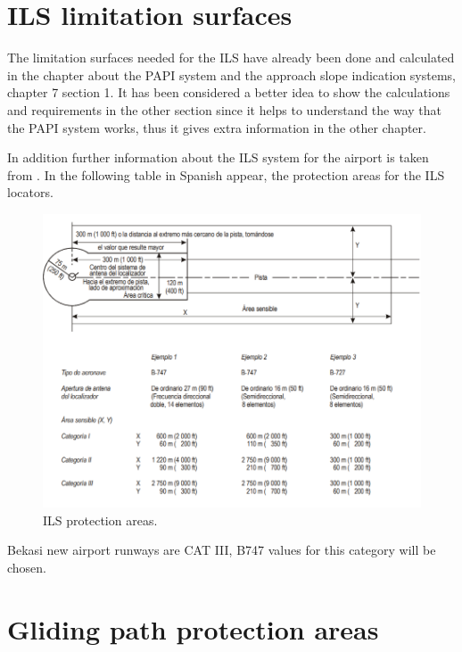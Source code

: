 	
	\section{ILS limitation surfaces}
		The limitation surfaces needed for the ILS have already been done and calculated in the chapter about the PAPI system and the approach slope indication systems, chapter 7 section 1. It has been considered a better idea to show the calculations and requirements in the other section since it helps to understand the way that the PAPI system works, thus it gives extra information in the other chapter. 
		
		In addition further information about the ILS system for the airport is taken from \cite{Telecomunicaciones}. In the following table in Spanish appear, the protection areas for the ILS locators.
		
		\begin{figure}[H]
			\centering
			\includegraphics[clip, trim=0cm 0cm 0cm 0cm, width=\textwidth]{./images/servidumbres/ILSprotect}
			\caption{ILS protection areas.}
			\label{ILSprotect}
		\end{figure}
	
	Bekasi new airport runways are CAT III,  B747 values for this category will be chosen.
	
	\section{Gliding path protection areas}
